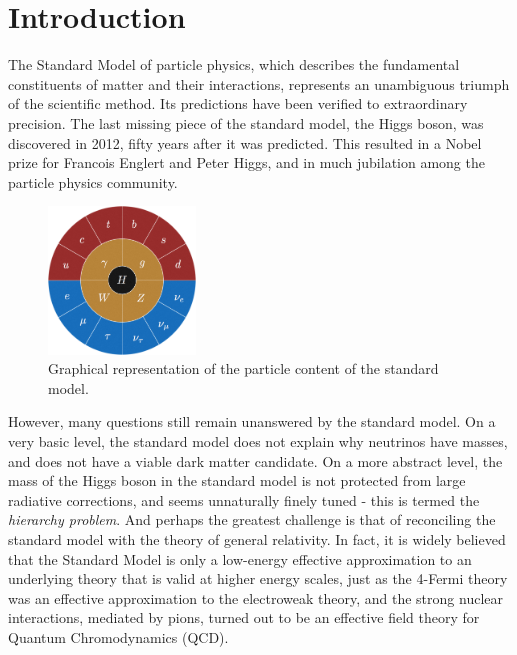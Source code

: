 \chapter{Introduction}\label{ch:introduction}

The Standard Model of particle physics, which describes the fundamental constituents of matter and their interactions, represents an unambiguous triumph of the scientific method. Its predictions have been verified to extraordinary precision. The last missing piece of the standard model, the Higgs boson, was discovered in 2012, fifty years after it was predicted. This resulted in a Nobel prize for Francois Englert and Peter Higgs, and in much jubilation among the particle physics community. 

\begin{figure}
  \centering
  \includegraphics[width=0.35\textwidth]{gfx/SM-wheel.png}
  \caption{Graphical representation of the particle content of the standard model.}
\end{figure}

However, many questions still remain unanswered by the standard model. On a very basic level, the standard model does not explain why neutrinos have masses, and does not have a viable dark matter candidate. On a more abstract level, the mass of the Higgs boson in the standard model is not protected from large radiative corrections, and seems unnaturally finely tuned - this is termed the \emph{hierarchy problem}. And perhaps the greatest challenge is that of reconciling the standard model with the theory of general relativity. In fact, it is widely believed that the Standard Model is only a low-energy effective approximation to an underlying theory that is valid at higher energy scales, just as the 4-Fermi theory was an effective approximation to the electroweak theory, and the strong nuclear interactions, mediated by pions, turned out to be an effective field theory for Quantum Chromodynamics (QCD).

